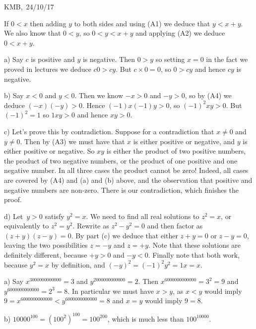 \documentclass[10pt]{article}
\begin{document}
\begin{flushright} KMB,\ 24/10/17\end{flushright}


\medskip
{} If $0<x$ then adding $y$ to both sides and using (A1) we deduce that $y<x+y$. We also know that $0<y$, so $0<y<x+y$ and applying (A2) we deduce $0<x+y$.

\medskip
{}

a) Say $c$ is positive and $y$ is negative. Then $0>y$ so setting $x=0$ in the fact we proved in lectures we deduce $c0>cy$. But $c\times 0=0$, so $0>cy$ and hence $cy$ is negative.

b) Say $x<0$ and $y<0$. Then we know $-x>0$ and $-y>0$, so by (A4) we deduce $(-x)(-y)>0$. Hence $(-1)x(-1)y>0$, so $(-1)^2xy>0$. But $(-1)^2=1$ so $1xy>0$ and hence $xy>0$.

c) Let's prove this by contradiction. Suppose for a contradiction that $x\not=0$ and $y\not=0$. Then by (A3) we must have that $x$ is either positive or negative, and $y$ is either positive or negative. So $xy$ is either the product of two positive numbers, the product of two negative numbers, or the product of one positive and one negative number. In all three cases the product cannot be zero! Indeed, all cases are covered by (A4) and (a) and (b) above, and the observation that positive and negative numbers are non-zero. There is our contradiction, which finishes the proof.

d) Let~$y>0$ satisfy $y^2=x$. We need to find all real solutions to $z^2=x$, or equivalently to $z^2=y^2$. Rewrite as $z^2-y^2=0$ and then factor as $(z+y)(z-y)=0$. By part (c) we deduce that either $z+y=0$ or $z-y=0$, leaving the two possibilities $z=-y$ and $z=+y$. Note that these solutions are definitely different, because $+y>0$ and $-y<0$. Finally note that both work, because $y^2=x$ by definition, and $(-y)^2=(-1)^2y^2=1x=x$.

\medskip
{}

a) Say $x^{3000000000000}=3$ and $y^{2000000000000}=2$. Then $x^{6000000000000}=3^2=9$ and $y^{6000000000000}=2^3=8$. In particular we must have $x>y$, as $x<y$ would imply $9=x^{6000000000000}<y^{6000000000000}=8$ and $x=y$ would imply $9=8$.

b) $10000^{100}=\left(100^2\right)^{100}=100^{200}$, which is much less than $100^{10000}$.
\end{document}
